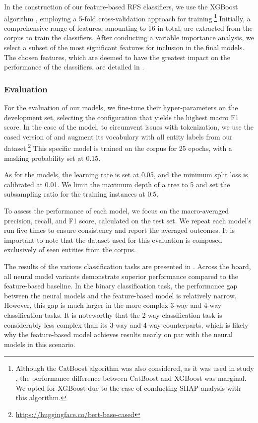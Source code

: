 In the construction of our feature-based RFS classifiers, we use the XGBoost algorithm \citep{xgboost2016}, employing a 5-fold cross-validation approach for training.\footnote{Although the CatBoost algorithm was also considered, as it was used in study \studF, the performance difference between CatBoost and XGBoost was marginal. We opted for XGBoost due to the ease of conducting SHAP analysis with this algorithm.} Initially, a comprehensive range of features, amounting to 16 in total, are extracted from the \webnlg corpus to train the classifiers. After conducting a variable importance analysis, we select a subset of the most significant features for inclusion in the final models. The chosen features, which are deemed to have the greatest impact on the performance of the classifiers, are detailed in .


\subsubsection{Evaluation}


For the evaluation of our models, we fine-tune their hyper-parameters on the development set, selecting the configuration that yields the highest macro F1 score. In the case of the \bert model, to circumvent issues with tokenization, we use the cased version of  and augment its vocabulary with all entity labels from our dataset.\footnote{\url{https://huggingface.co/bert-base-cased}} This specific \bert model is trained on the \webnlg corpus for 25 epochs, with a masking probability set at 0.15.

As for the  models, the learning rate is set at 0.05, and the minimum split loss is calibrated at 0.01. We limit the maximum depth of a tree to 5 and set the subsampling ratio for the training instances at 0.5.


To assess the performance of each model, we focus on the macro-averaged precision, recall, and F1 score, calculated on the test set. We repeat each model's run five times to ensure consistency and report the averaged outcomes. It is important to note that the dataset used for this evaluation is composed exclusively of seen entities from the \webnlg corpus.


The results of the various classification tasks are presented in . Across the board, all neural model variants demonstrate superior performance compared to the feature-based baseline. In the binary classification task, the performance gap between the neural models and the feature-based model is relatively narrow. However, this gap is much larger in the more complex 3-way and 4-way classification tasks. It is noteworthy that the 2-way classification task is considerably less complex than its 3-way and 4-way counterparts, which is likely why the feature-based model achieves results nearly on par with the neural models in this scenario.

